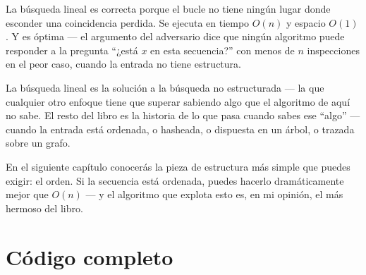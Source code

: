 \documentclass[11pt,a4paper]{article}
\begin{document}
La búsqueda lineal es correcta porque el bucle no tiene ningún lugar donde esconder una coincidencia perdida. Se ejecuta en tiempo $O(n)$ y espacio $O(1)$. Y es óptima --- el argumento del adversario dice que ningún algoritmo puede responder a la pregunta ``¿está $x$ en esta secuencia?'' con menos de $n$ inspecciones en el peor caso, cuando la entrada no tiene estructura.

La búsqueda lineal es la solución a la búsqueda no estructurada --- la que cualquier otro enfoque tiene que superar sabiendo algo que el algoritmo de aquí no sabe. El resto del libro es la historia de lo que pasa cuando sabes ese ``algo'' --- cuando la entrada está ordenada, o hasheada, o dispuesta en un árbol, o trazada sobre un grafo.

En el siguiente capítulo conocerás la pieza de estructura más simple que puedes exigir: el orden. Si la secuencia está ordenada, puedes hacerlo dramáticamente mejor que $O(n)$ --- y el algoritmo que explota esto es, en mi opinión, el más hermoso del libro.

\section{Código completo}
\end{document}
